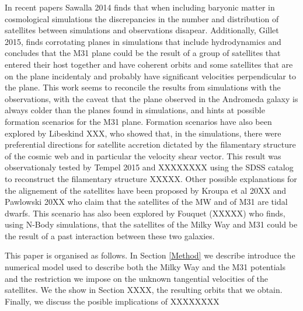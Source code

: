 \documentclass[useAMS,usenatbib]{mn2e}
\begin{document}
In recent papers Sawalla 2014 finds that when including baryonic matter in
cosmological simulations the discrepancies in the number and
distribution of satellites between simulations and
observations disapear. Additionally, Gillet 2015, finds corrotating
planes in simulations that include hydrodynamics and concludes that the M31
plane could be the result of a group of satellites that entered their
host together and have coherent orbits and some satellites that are on
the plane incidentaly and probably have significant velocities
perpendicular to the plane. This work seems to reconcile the results
from simulations with the observations, with the caveat that the plane observed in the 
Andromeda galaxy is always colder than the planes found in simulations, 
and hints at possible formation scenarios for the M31 plane.  
Formation scenarios have also been explored by Libeskind XXX, who
showed that, in the simulations, there were preferential directions
for satellite accretion dictated by the filamentary structure of the
cosmic web and in particular the velocity shear vector. This result
was observationaly tested by Tempel 2015 and XXXXXXXX using the SDSS
catalog to reconstruct the filamentary structure XXXXX.
Other possible explanations for the alignement of the satellites have
been proposed by Kroupa et al 20XX and Pawlowski 20XX who claim that
the satellites of the MW and of M31 are tidal dwarfs. This scenario
has also been explored by Fouquet (XXXXX) who finds, using N-Body
simulations, that the satellites of the Milky Way and M31 could be the
result of a past interaction between these two galaxies. 

This paper is organised as follows. 
In Section \ref{Method} we describe introduce the numerical model used to describe both the Milky Way and the M31 potentials and the restriction we impose on the unknown tangential velocities of the satellites. We the show in Section XXXX, the resulting orbits that we obtain. Finally, we discuss the posible implications of XXXXXXXX   
\end{document}
